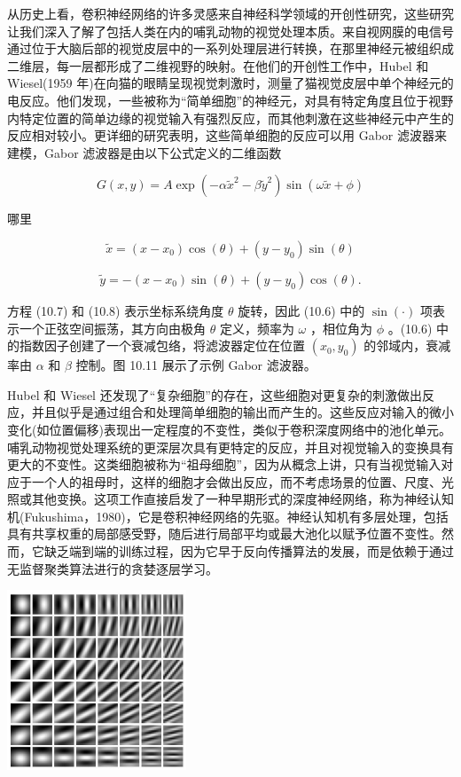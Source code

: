 \documentclass[10pt]{report}
\begin{document}
从历史上看，卷积神经网络的许多灵感来自神经科学领域的开创性研究，这些研究让我们深入了解了包括人类在内的哺乳动物的视觉处理本质。来自视网膜的电信号通过位于大脑后部的视觉皮层中的一系列处理层进行转换，在那里神经元被组织成二维层，每一层都形成了二维视野的映射。在他们的开创性工作中，Hubel 和 Wiesel(1959 年)在向猫的眼睛呈现视觉刺激时，测量了猫视觉皮层中单个神经元的电反应。他们发现，一些被称为“简单细胞”的神经元，对具有特定角度且位于视野内特定位置的简单边缘的视觉输入有强烈反应，而其他刺激在这些神经元中产生的反应相对较小。更详细的研究表明，这些简单细胞的反应可以用 Gabor 滤波器来建模，Gabor 滤波器是由以下公式定义的二维函数

\[
G\left( {x,y}\right)  = A\exp \left( {-\alpha {\widetilde{x}}^{2} - \beta {\widetilde{y}}^{2}}\right) \sin \left( {\omega \widetilde{x} + \phi }\right)  \tag{10.6}
\]

哪里

\[
\widetilde{x} = \left( {x - {x}_{0}}\right) \cos \left( \theta \right)  + \left( {y - {y}_{0}}\right) \sin \left( \theta \right)  \tag{10.7}
\]

\[
\widetilde{y} =  - \left( {x - {x}_{0}}\right) \sin \left( \theta \right)  + \left( {y - {y}_{0}}\right) \cos \left( \theta \right) . \tag{10.8}
\]

方程 (10.7) 和 (10.8) 表示坐标系绕角度 \(\theta\) 旋转，因此 (10.6) 中的 \(\sin \left( \cdot \right)\) 项表示一个正弦空间振荡，其方向由极角 \(\theta\) 定义，频率为 \(\omega\) ，相位角为 \(\phi\) 。(10.6) 中的指数因子创建了一个衰减包络，将滤波器定位在位置 \(\left( {{x}_{0},{y}_{0}}\right)\) 的邻域内，衰减率由 \(\alpha\) 和 \(\beta\) 控制。图 10.11 展示了示例 Gabor 滤波器。

Hubel 和 Wiesel 还发现了“复杂细胞”的存在，这些细胞对更复杂的刺激做出反应，并且似乎是通过组合和处理简单细胞的输出而产生的。这些反应对输入的微小变化(如位置偏移)表现出一定程度的不变性，类似于卷积深度网络中的池化单元。哺乳动物视觉处理系统的更深层次具有更特定的反应，并且对视觉输入的变换具有更大的不变性。这类细胞被称为“祖母细胞”，因为从概念上讲，只有当视觉输入对应于一个人的祖母时，这样的细胞才会做出反应，而不考虑场景的位置、尺度、光照或其他变换。这项工作直接启发了一种早期形式的深度神经网络，称为神经认知机(Fukushima，1980)，它是卷积神经网络的先驱。神经认知机有多层处理，包括具有共享权重的局部感受野，随后进行局部平均或最大池化以赋予位置不变性。然而，它缺乏端到端的训练过程，因为它早于反向传播算法的发展，而是依赖于通过无监督聚类算法进行的贪婪逐层学习。

\begin{center}
\includegraphics[max width=0.4\textwidth]{images/0194e279-9b28-703a-88f4-c3ac21e2010d_322_916_374_601_605_0.jpg}
\end{center}
\hspace*{3em} 
\end{document}
